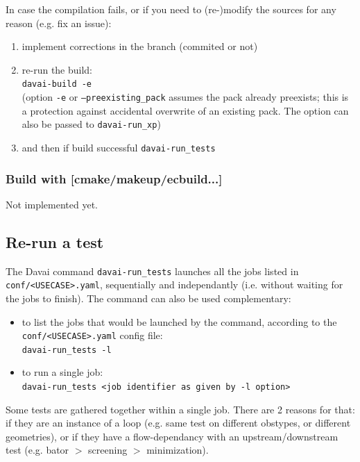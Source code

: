 \documentclass[a4paper,10pt,twoside]{article}
\begin{document}
\noindent In case the compilation fails, or if you need to (re-)modify the sources for any reason (e.g. fix an issue):
\begin{enumerate}[label=\arabic*.]
  \item implement corrections in the branch (commited or not)
  \item re-run the build:\\
  \texttt{davai-build -e}\\
  (option \texttt{-e} or \texttt{--preexisting\_pack} assumes the pack already preexists; this is a protection against accidental overwrite of an existing pack. The option can also be passed to \texttt{davai-run\_xp})
  \item and then if build successful \texttt{davai-run\_tests}
 \end{enumerate}

\subsubsection{Build with [cmake/makeup/ecbuild...]}
Not implemented yet.

\subsection{Re-run a test}

The Davai command \texttt{davai-run\_tests} launches all the jobs listed in \texttt{conf/<USECASE>.yaml}, sequentially and independantly (i.e. without waiting for the jobs to finish). The command can also be used complementary:
\begin{itemize}
 \item to list the jobs that would be launched by the command, according to the \texttt{conf/<USECASE>.yaml} config file:\\
 \texttt{davai-run\_tests -l}
 \item to run a single job:\\
 \texttt{davai-run\_tests <job identifier as given by -l option>}
\end{itemize}


Some tests are gathered together within a single job. There are 2 reasons for that: if they are an instance of a loop (e.g. same test on different obstypes, or different geometries), or if they have a flow-dependancy with an upstream/downstream test (e.g. bator $>$ screening $>$ minimization).
\end{document}
